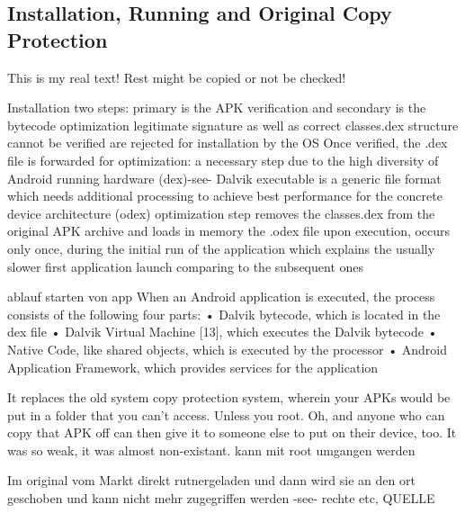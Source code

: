 \subsection{Installation, Running and Original Copy Protection} \label{subsection:android-copy}
This is my real text! Rest might be copied or not be checked!

%
Installation two steps:  primary is the APK verification and secondary is the bytecode optimization\newline
legitimate signature as well as correct classes.dex structure cannot be verified are rejected for installation by the OS\newline
Once verified, the .dex file is forwarded for optimization: a necessary step due to the high diversity of Android running hardware (dex)-see- Dalvik executable is a generic file format which needs additional processing to achieve best performance for the concrete device architecture (odex)\newline
optimization\newline
step removes the classes.dex from the original APK archive and loads in memory the .odex file upon execution, occurs only once, during the initial run of the application which explains the usually slower first application launch comparing to the subsequent ones

ablauf starten von app\newline
When an Android application is executed, the process consists of the following four parts:
• Dalvik bytecode, which is located in the dex file
• Dalvik Virtual Machine [13], which executes the Dalvik bytecode
• Native Code, like shared objects, which is executed by the processor
• Android Application Framework, which provides services for the application\newline
\cite{kovachevaMaster}
%



It replaces the old system copy protection system, wherein your APKs would be put in a folder that you can't access. Unless you root. Oh, and anyone who can copy that APK off can then give it to someone else to put on their device, too. It was so weak, it was almost non-existant.\newline
kann mit root umgangen werden


Im original vom Markt direkt rutnergeladen und dann wird sie an den ort geschoben und kann nicht mehr zugegriffen werden -see- rechte etc, QUELLE\newline
